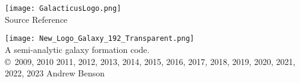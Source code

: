 \documentclass[letterpaper,10pt,headsepline]{scrbook}
\begin{document}
\lstset{language=[95]Fortran}

\frontmatter

\pagestyle{empty}
\begin{center}
\texttt{[image: GalacticusLogo.png]}\\

\Huge Source Reference \normalsize

\texttt{[image: New\_Logo\_Galaxy\_192\_Transparent.png]}\\
A semi-analytic galaxy formation code.\\

\copyright\ 2009, 2010 2011, 2012, 2013, 2014, 2015, 2016, 2017, 2018, 2019, 2020, 2021, 2022, 2023 Andrew Benson
\end{center}

\tableofcontents

\mainmatter
\pagestyle{headings}



\backmatter






\printglossaries

\citeindextrue
\printindex[code]
\end{document}
